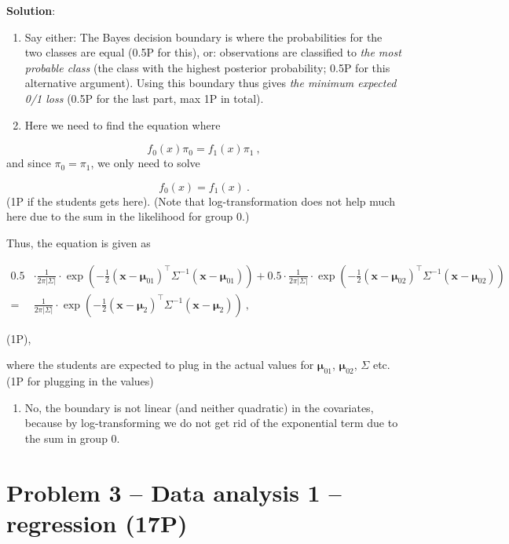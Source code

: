 \documentclass[
]{article}
\providecommand{\tightlist}{%
  \setlength{\itemsep}{0pt}\setlength{\parskip}{0pt}}
\begin{document}
\textbf{Solution}:

\begin{enumerate}
\def\labelenumi{(\roman{enumi})}
\item
  Say either: The Bayes decision boundary is where the probabilities for
  the two classes are equal (0.5P for this), or: observations are
  classified to \emph{the most probable class} (the class with the
  highest posterior probability; 0.5P for this alternative argument).
  Using this boundary thus gives \emph{the minimum expected 0/1 loss}
  (0.5P for the last part, max 1P in total).
\item
  Here we need to find the equation where
\end{enumerate}

\[f_0(x)\pi_0 = f_1(x) \pi_1 \ , \] and since \(\pi_0=\pi_1\), we only
need to solve

\[f_0(x) = f_1(x)   \ . \] (1P if the students gets here). (Note that
log-transformation does not help much here due to the sum in the
likelihood for group 0.)

Thus, the equation is given as

\begin{align*}
0.5 & \cdot \frac{1}{2\pi |\Sigma|} \cdot \exp\left(- \frac{1}{2} (\bm{x}-\bm{\mu}_{01})^\top \Sigma^{-1} (\bm{x}- \bm{\mu}_{01})\right) + 0.5 \cdot \frac{1}{2\pi |\Sigma|} \cdot \exp\left( -\frac{1}{2} (\bm{x}-\bm{\mu}_{02})^\top \Sigma^{-1} (\bm{x}- \bm{\mu}_{02})\right)  \\
 = &   \frac{1}{2\pi |\Sigma|} \cdot \exp\left(-\frac{1}{2} (\bm{x}-\bm{\mu}_{2})^\top\Sigma^{-1}(\bm{x}-\bm{\mu}_{2})\right) \ ,
\end{align*}

(1P),

where the students are expected to plug in the actual values for
\(\bm{\mu}_{01}\), \(\bm{\mu}_{02}\), \(\Sigma\) etc. (1P for plugging
in the values)

\begin{enumerate}
\def\labelenumi{(\roman{enumi})}
\setcounter{enumi}{2}
\tightlist
\item
  No, the boundary is not linear (and neither quadratic) in the
  covariates, because by log-transforming we do not get rid of the
  exponential term due to the sum in group 0.
\end{enumerate}

\hypertarget{problem-3-data-analysis-1-regression-17p}{%
\section{Problem 3 -- Data analysis 1 -- regression
(17P)}\label{problem-3-data-analysis-1-regression-17p}}
\end{document}
